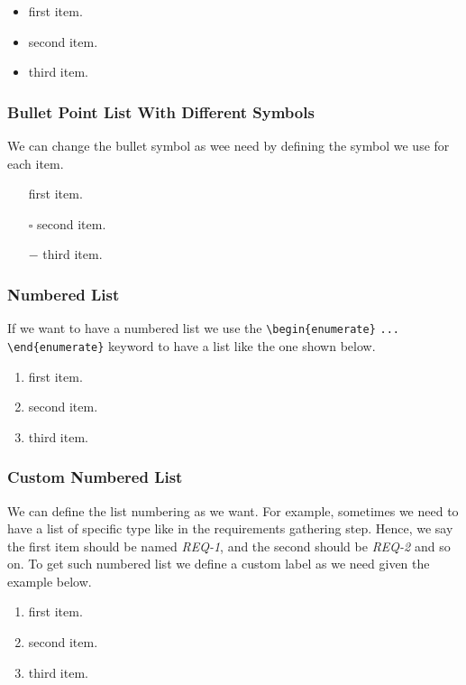 \begin{itemize}
    \item first item.
    \item second item.
    \item third item.
\end{itemize}

\subsubsection{Bullet Point List With Different Symbols}

We can change the bullet symbol as wee need by defining the symbol we use for each item.

\begin{itemize}     
    \item[\textbullet] first item.
    \item[$\square$] second item.
    \item[$-$] third item.
\end{itemize}

\subsubsection{Numbered List}

If we want to have a numbered list we use the \verb|\begin{enumerate}| \verb|...| \verb|\end{enumerate}| keyword to have a list like the one shown below.

\begin{enumerate}
    \item first item.
    \item second item.
    \item third item.
\end{enumerate}

\subsubsection{Custom Numbered List}

We can define the list numbering as we want. For example, sometimes we need to have a list of specific type like in the requirements gathering step. Hence, we say the first item should be named \emph{REQ-1}, and the second should be \emph{REQ-2} and so on. To get such numbered list we define a custom label as we need given the example below. 

\begin{enumerate}[label=\textbf{REQ-\arabic*:}]
    \item first item.
    \item second item.
    \item third item.
\end{enumerate}

